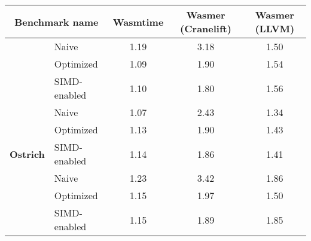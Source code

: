 
\begin{tabular}{ll|ccc}
    \multicolumn{2}{c|}{\textbf{Benchmark name}}                 & \textbf{Wasmtime}                   & \textbf{Wasmer (Cranelift)} & \textbf{Wasmer (LLVM)}                                    \\ \hline
    \rowcolor[HTML]{C0C0C0}
    \cellcolor[HTML]{C0C0C0}                                     & Naive                               & 1.19                        & 3.18                        & 1.50                        \\
    \rowcolor[HTML]{C0C0C0}
    \cellcolor[HTML]{C0C0C0}                                     & Optimized                           & 1.09                        & 1.90                        & 1.54                        \\
    \rowcolor[HTML]{C0C0C0}
    \multirow{-3}{*}{\cellcolor[HTML]{C0C0C0}\textbf{Polybench}} & SIMD-enabled                        & 1.10                        & 1.80                        & 1.56                        \\ \hline
                                                                 & Naive                               & 1.07                        & 2.43                        & 1.34                        \\
                                                                 & Optimized                           & 1.13                        & 1.90                        & 1.43                        \\
    \multirow{-3}{*}{\textbf{Ostrich}}                           & SIMD-enabled                        & 1.14                        & 1.86                        & 1.41                        \\ \hline
    \rowcolor[HTML]{C0C0C0}
    \cellcolor[HTML]{C0C0C0}                                     & {\color[HTML]{333333} Naive}        & {\color[HTML]{333333} 1.23} & {\color[HTML]{333333} 3.42} & {\color[HTML]{333333} 1.86} \\
    \rowcolor[HTML]{C0C0C0}
    \cellcolor[HTML]{C0C0C0}                                     & {\color[HTML]{333333} Optimized}    & {\color[HTML]{333333} 1.15} & {\color[HTML]{333333} 1.97} & {\color[HTML]{333333} 1.50} \\
    \rowcolor[HTML]{C0C0C0}
    \multirow{-3}{*}{\cellcolor[HTML]{C0C0C0}\textbf{NPB}}       & {\color[HTML]{333333} SIMD-enabled} & {\color[HTML]{333333} 1.15} & {\color[HTML]{333333} 1.89} & {\color[HTML]{333333} 1.85}
\end{tabular}
